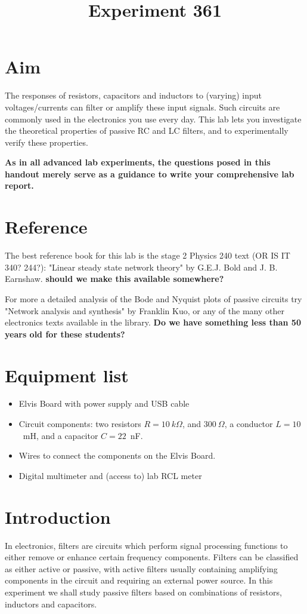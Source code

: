 \documentclass{article}
\begin{document}
\title{Experiment 361}
\author{ }
\maketitle

\section*{Aim}
The responses of resistors, capacitors and inductors to (varying)
input voltages/currents can filter or amplify these input
signals. Such circuits are commonly used in the electronics you use
every day. This lab lets you investigate the theoretical properties of
passive RC and LC filters, and to experimentally verify these
properties.

{\bf As in all advanced lab experiments, the questions posed in this
handout merely serve as a guidance to write your comprehensive lab
report.}

\section*{Reference}
The best reference book for this lab is the stage 2 Physics 240 text
(OR IS IT 340? 244?): "Linear steady state network theory" by
G.E.J. Bold and J. B. Earnshaw. {\bf should we make this available
  somewhere?}

For more a detailed analysis of the Bode and Nyquist plots of passive
circuits try "Network analysis and synthesis" by Franklin Kuo, or any
of the many other electronics texts available in the library. {\bf Do
  we have something less than 50 years old for these students?}

\section*{Equipment list}
\begin{itemize}
\item Elvis Board with power supply and USB cable
\item Circuit components: two resistors
  $R = 10~k\Omega$, and $300~\Omega$, a conductor $L = 10$~mH, and a
  capacitor $C=22$~nF.
\item Wires to connect the components on the Elvis Board.
\item Digital multimeter and (access to) lab RCL meter
\end{itemize}

\section*{Introduction}
In electronics, filters are circuits which perform signal processing
functions to either remove or enhance certain frequency
components. Filters can be classified as either active or passive,
with active filters usually containing amplifying components in the
circuit and requiring an external power source. In this experiment we
shall study passive filters based on combinations of resistors,
inductors and capacitors. 
\end{document}
